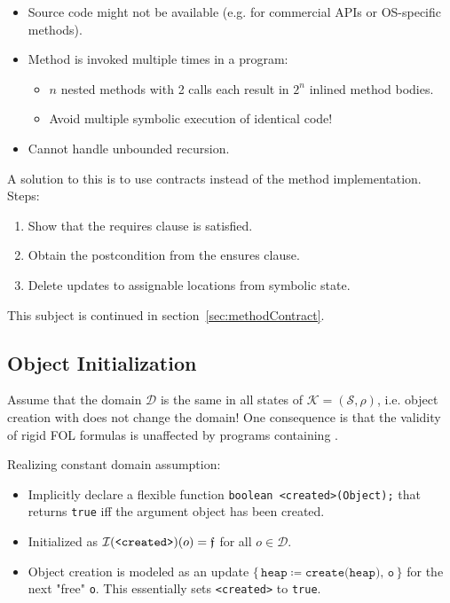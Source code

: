 			\begin{itemize}
				\item Source code might not be available (e.g. for commercial APIs or OS-specific methods).
				\item Method is invoked multiple times in a program:
					\begin{itemize}
						\item \(n\) nested methods with 2 calls each result in \(2^n\) inlined method bodies.
						\item Avoid multiple symbolic execution of identical code!
					\end{itemize}
				\item Cannot handle unbounded recursion.
			\end{itemize}

			A solution to this is to use contracts instead of the method implementation. Steps:
			\begin{enumerate}
				\item Show that the requires clause is satisfied.
				\item Obtain the postcondition from the ensures clause.
				\item Delete updates to assignable locations from symbolic state.
			\end{enumerate}
			This subject is continued in section~\ref{sec:methodContract}.

	\subsection{Object Initialization}
		Assume that the domain \(\mathcal{D}\) is the same in all states of \( \mathcal{K} = (\mathcal{S}, \rho) \), i.e. object creation with  does not change the domain! One consequence is that the validity of rigid FOL formulas is unaffected by programs containing .

		Realizing constant domain assumption:
		\begin{itemize}
			\item Implicitly declare a flexible function \texttt{boolean <created>(Object);} that returns \texttt{true} iff the argument object has been created.
			\item Initialized as \( \mathcal{I}(\texttt{<created>})(o) = \mathfrak{f} \) for all \( o \in \mathcal{D} \).
			\item Object creation is modeled as an update \( \{\, \texttt{heap} \coloneqq \texttt{create(heap), o} \,\} \) for the next "free" \texttt{o}. This essentially sets \texttt{<created>} to \texttt{true}.
		\end{itemize}

